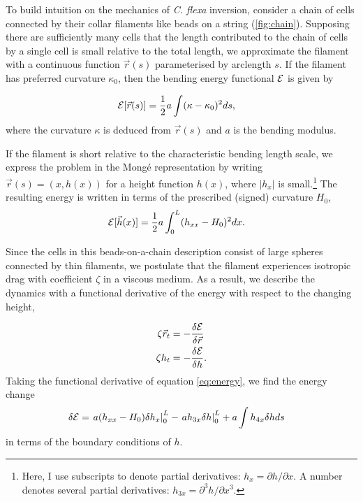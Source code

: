 To build intuition on the mechanics of \textit{C. flexa} inversion, consider a chain of cells connected by their collar filaments like beads on a string (\cref{fig:chain}). 
Supposing there are sufficiently many cells that the length contributed to the chain of cells by a single cell is small relative to the total length, we approximate the filament with a continuous function $\vec{r}(s)$ parameterised by arclength $s$.
If the filament has preferred curvature $\kappa_0$, then the bending energy functional $\mathcal{E}$ is given by 

\begin{align*}
    \mathcal{E}[\vec{r}(s)] &= \frac{1}{2} a \int (\kappa - \kappa_0)^2 ds, 
\end{align*}
\noindent where the curvature $\kappa$ is deduced from $\vec{r}(s)$ and $a$ is the bending modulus. 

If the filament is short relative to the characteristic bending length scale, we express the problem in the Mong\'e representation by writing $\vec{r}(s) = (x, h(x))$ for a height function $h(x)$, where $|h_x|$ is small.\footnote{Here, I use subscripts to denote partial derivatives: $h_x = \partial h / \partial x$. A number denotes several partial derivatives: $h_{3x} = \partial^3 h / \partial x^3$.} 
The resulting energy is written in terms of the prescribed (signed) curvature $H_0$, 
\begin{align}
    \mathcal{E}[\vec{h}(x)] &= \frac{1}{2} a \int_0^L (h_{xx} - H_0)^2 dx. \label{eq:energy}
\end{align}

Since the cells in this beads-on-a-chain description consist of large spheres connected by thin filaments, we postulate that the filament experiences isotropic drag with coefficient $\zeta$ in a viscous medium.
As a result, we describe the dynamics with a functional derivative of the energy with respect to the changing height,

\begin{align}
    \zeta \vec{r}_t &= -\frac{\delta \mathcal{E}}{\delta \vec{r}} \nonumber \\
    \zeta h_t &= -\frac{\delta \mathcal{E}}{\delta h}. \label{eq:eom} 
\end{align}
Taking the functional derivative of equation \ref{eq:energy}, we find the energy change
\begin{align}
    \delta \mathcal{E} &= \left. a(h_{xx} - H_0)\delta h_x \right|_0^L - \left. ah_{3x} \delta h \right|_0^L + a \int h_{4x} \delta h ds \label{eq:func_deriv} 
\end{align}
in terms of the boundary conditions of $h$.

